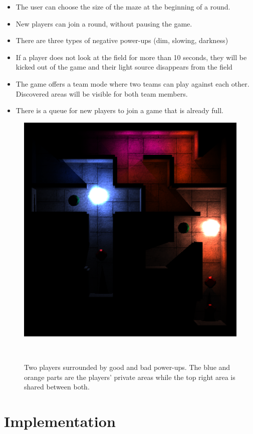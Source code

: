 \documentclass{sigchi}
\begin{document}
	\begin{itemize}
		\item The user can choose the size of the maze at the beginning of a round.
		\item New players can join a round, without pausing the game.
		\item There are three types of negative power-ups (dim, slowing, darkness)
		\item If a player does not look at the field for more than 10 seconds, they will be kicked out of the game and their light source disappears from the field
		\item The game offers a team mode where two teams can play against each other. Discovered areas will be visible for both team members.
		\item There is a queue for new players to join a game that is already full. 		
	\end{itemize}
\begin{figure}
\centering
  \includegraphics[width=0.9\columnwidth]{figures/maze}
  \caption{Two players surrounded by good and bad power-ups. The blue and orange parts are the players' private areas while the top right area is shared between both. }~\label{fig:figure1}
\end{figure}
\section{Implementation}
\end{document}
